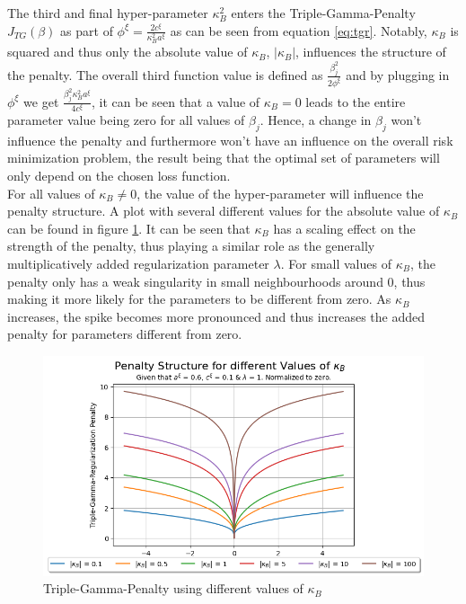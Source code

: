 \documentclass[12pt,a4paper]{article}
\begin{document}
The third and final hyper-parameter $\kappa_B^2$ enters the Triple-Gamma-Penalty $J_{TG}(\beta)$ as part of $\phi^\xi = \frac{2c^\xi}{\kappa_B^2 a^\xi}$ as can be seen from equation \ref{eq:tgr}. Notably, $\kappa_B$ is squared and thus only the absolute value of $\kappa_B$, $|\kappa_B|$, influences the structure of the penalty. The overall third function value is defined as $\frac{\beta_j^2}{2\phi^\xi}$ and by plugging in $\phi^\xi$ we get $\frac{\beta_j^2\kappa_ B^2a^\xi}{4c^\xi}$, it can be seen that a value of $\kappa_B = 0$ leads to the entire parameter value being zero for all values of $\beta_j$. Hence, a change in $\beta_j$ won't influence the penalty and furthermore won't have an influence on the overall risk minimization problem, the result being that the optimal set of parameters will only depend on the chosen loss function.\\

For all values of $\kappa_B \neq 0$, the value of the hyper-parameter will influence the penalty structure. A plot with several different values for the absolute value of $\kappa_B$ can be found in figure \ref{fig:TGPenalty_ChangeInKappa}. It can be seen that $\kappa_B$ has a scaling effect on the strength of the penalty, thus playing a similar role as the generally multiplicatively added regularization parameter $\lambda$. For small values of $\kappa_B$, the penalty only has a weak singularity in small neighbourhoods around $0$, thus making it more likely for the parameters to be different from zero. As $\kappa_B$ increases, the spike becomes more pronounced and thus increases the added penalty for parameters different from zero. \\

\begin{figure}[h!]
\centering
\includegraphics[scale=0.75]{../02_simulation/021_simulation_figures/TGPenalty_ChangeInKappa.png}
\caption{Triple-Gamma-Penalty using different values of $\kappa_B$}
\label{fig:TGPenalty_ChangeInKappa}
\end{figure}
\end{document}
